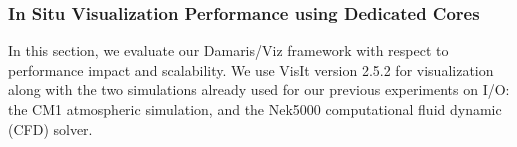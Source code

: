 



\subsubsection{In Situ Visualization Performance using Dedicated Cores}

In this section, we evaluate our Damaris/Viz framework with respect
to performance impact and scalability. We use VisIt version 2.5.2 for visualization
along with the two simulations already used for our previous experiments on I/O: the CM1
atmospheric simulation, and the Nek5000 computational fluid dynamic (CFD) solver.

